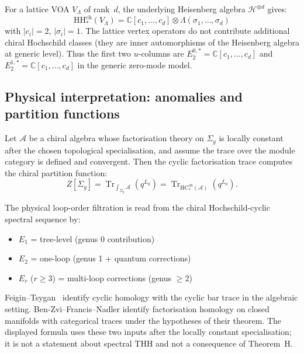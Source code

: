 \begin{example}
\label{ex:E2-lattice}
For a lattice VOA $V_\Lambda$ of rank~$d$, the underlying Heisenberg
algebra $\mathcal{H}^{\otimes d}$ gives:
\[\mathrm{HH}_*^{\mathrm{ch}}(V_\Lambda) = \mathbb{C}[c_1, \ldots, c_d]
\otimes \Lambda(\sigma_1, \ldots, \sigma_d)\]
with $|c_i| = 2$, $|\sigma_i| = 1$. The lattice vertex operators do not
contribute additional chiral Hochschild classes (they are inner automorphisms of the
Heisenberg algebra at generic level). Thus the first two $u$-columns
are
$E_2^{0,*} = \mathbb{C}[c_1, \ldots, c_d]$
and $E_2^{1,*} = \mathbb{C}[c_1, \ldots, c_d]$ in the generic
zero-mode model.
\end{example}

\subsection{Physical interpretation: anomalies and partition functions}

\begin{theorem}
\label{thm:partition-cyclic}
Let $\mathcal A$ be a chiral algebra whose factorisation theory on
$\Sigma_g$ is locally constant after the chosen topological
specialisation, and assume the trace over the module category is
defined and convergent. Then the cyclic factorisation trace computes
the chiral partition function:
\[
Z[\Sigma_g]
= \operatorname{Tr}_{\int_{\Sigma_g}\mathcal A}(q^{L_0})
= \operatorname{Tr}_{\mathrm{HC}^{\mathrm{ch}}_*(\mathcal A)}(q^{L_0}).
\]

The physical loop-order filtration is read from the chiral
Hochschild-cyclic spectral sequence by:
\begin{itemize}
\item $E_1$ = tree-level (genus 0 contribution)
\item $E_2$ = one-loop (genus 1 + quantum corrections)
\item $E_r$ ($r \geq 3$) = multi-loop corrections (genus $\geq 2$)
\end{itemize}
\end{theorem}

\begin{remark}[Provenance]
Feigin--Tsygan~\cite{FT87} identify cyclic homology with the cyclic
bar trace in the algebraic setting. Ben-Zvi--Francis--Nadler
\cite{BZFN10} identify factorisation homology on closed manifolds
with categorical traces under the hypotheses of their theorem. The
displayed formula uses these two inputs after the locally constant
specialisation; it is not a statement about spectral $\mathrm{THH}$
and not a consequence of Theorem~H.
\end{remark}

